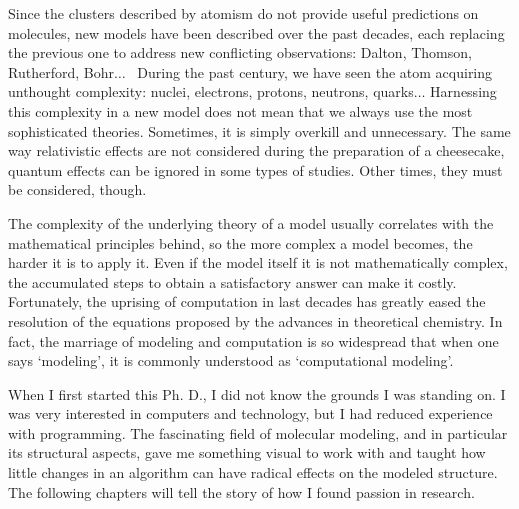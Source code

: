 Since the clusters described by atomism do not provide useful predictions on molecules, new models have been described over the past decades, each replacing the previous one to address new conflicting observations: Dalton, Thomson, Rutherford, Bohr$ \ldots $ \  During the past century, we have seen the atom acquiring unthought complexity: nuclei, electrons, protons, neutrons, quarks$ \ldots $  Harnessing this complexity in a new model does not mean that we always use the most sophisticated theories. Sometimes, it is simply overkill and unnecessary. The same way relativistic effects are not considered during the preparation of a cheesecake, quantum effects can be ignored in some types of studies. Other times, they must be considered, though.

The complexity of the underlying theory of a model usually correlates with the mathematical principles behind, so the more complex a model becomes, the harder it is to apply it. Even if the model itself it is not mathematically complex, the accumulated steps to obtain a satisfactory answer can make it costly. Fortunately, the uprising of computation in last decades has greatly eased the resolution of the equations proposed by the advances in theoretical chemistry. In fact, the marriage of modeling and computation is so widespread that when one says ‘modeling’, it is commonly understood as ‘computational modeling’.


When I first started this Ph. D., I did not know the grounds I was standing on. I was very interested in computers and technology, but I had reduced experience with programming. The fascinating field of molecular modeling, and in particular its structural aspects, gave me something visual to work with and taught how little changes in an algorithm can have radical effects on the modeled structure. The following chapters will tell the story of how I found passion in research.

